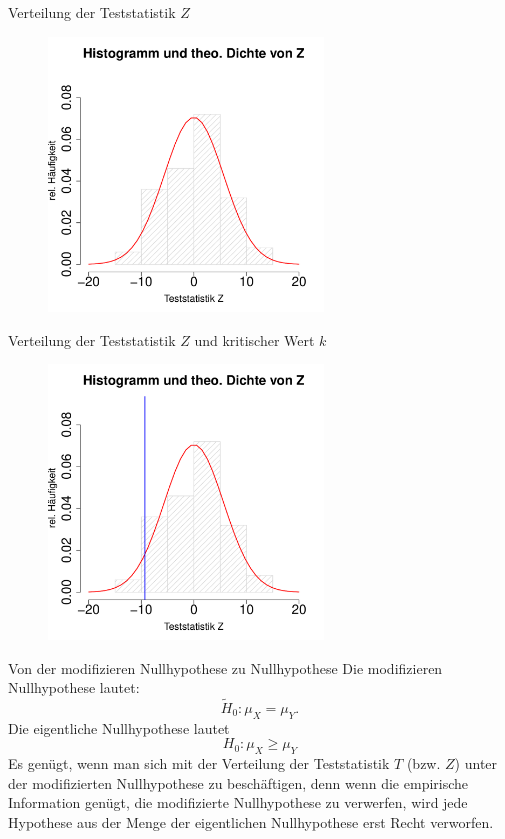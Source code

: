 \documentclass[usenames,dvipsnames,handout]{beamer}
\begin{document}
\begin{frame}{Verteilung der Teststatistik $Z$}
\begin{figure}[ht]
 	\centering
 	      \includegraphics[width=0.65\textwidth]{distZ.pdf}
 	\end{figure}
\end{frame}

\begin{frame}{Verteilung der Teststatistik $Z$ und kritischer Wert $k$}
\begin{figure}[ht]
 	\centering
 	      \includegraphics[width=0.65\textwidth]{distZ2.pdf}
 	\end{figure}
\end{frame}



\begin{frame}{Von der modifizieren Nullhypothese zu Nullhypothese}
Die modifizieren Nullhypothese lautet: $$\tilde{H}_{0}:  \mu_{X} = \mu_{Y}.$$  Die eigentliche Nullhypothese lautet $$H_{0}:  \mu_{X} \geq \mu_{Y}  $$
Es genügt, wenn man sich mit der Verteilung der Teststatistik $T$ (bzw. $Z$) unter der modifizierten
Nullhypothese zu beschäftigen, denn wenn die empirische Information genügt, die modifizierte Nullhypothese
zu verwerfen, wird jede Hypothese aus der Menge der eigentlichen Nullhypothese erst Recht verworfen.
\end{frame}
\end{document}
